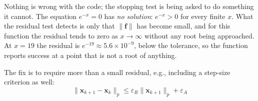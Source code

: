 \begin{solution}
    
    Nothing is wrong with the code; the stopping test is being asked to do something it cannot. The equation $e^{-x} = 0$ has \emph{no solution}: $e^{-x} > 0$ for every finite $x$. What the residual test detects is only that $\|\mathbf{f}\|$ has become small, and for this function the residual tends to zero as $x \to \infty$ without any root being approached. At $x = 19$ the residual is $e^{-19} \approx 5.6 \times 10^{-9}$, below the tolerance, so the function reports success at a point that is not a root of anything.

    The fix is to require more than a small residual, e.g., including a step-size criterion as well:
    \[
        \|\mathbf{x}_{k+1} - \mathbf{x}_k\|_p \le \varepsilon_R \|\mathbf{x}_{k+1}\|_p + \varepsilon_A
    \]
        
\end{solution}

